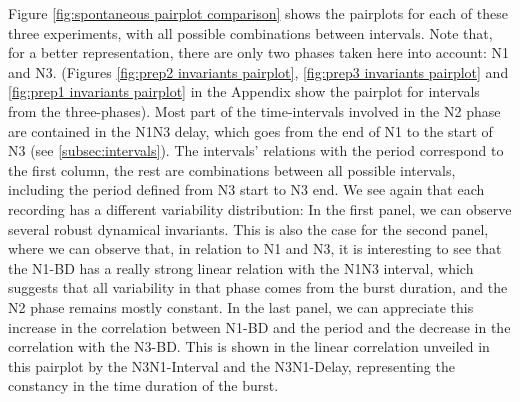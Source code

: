 Figure \ref{fig:spontaneous pairplot comparison} shows the pairplots for each of these three experiments, with all possible combinations between intervals. Note that, for a better representation, there are only two phases taken here into account: N1 and N3. (Figures \ref{fig:prep2 invariants pairplot}, \ref{fig:prep3 invariants pairplot} and \ref{fig:prep1 invariants pairplot} in the Appendix show the pairplot for intervals from the three-phases). Most part of the time-intervals involved in the N2 phase are contained in the N1N3 delay, which goes from the end of N1 to the start of N3 (see \ref{subsec:intervals}). The intervals' relations with the period correspond to the first column, the rest are combinations between all possible intervals, including the period defined from N3 start to N3 end. We see again that each recording has a different variability distribution: In the first panel, we can observe several robust dynamical invariants. This is also the case for the second panel, where we can observe that, in relation to N1 and N3, it is interesting to see that the N1-BD has a really strong linear relation with the N1N3 interval, which suggests that all variability in that phase comes from the burst duration, and the N2 phase remains mostly constant. In the last panel, we can appreciate this increase in the correlation between N1-BD and the period and the decrease in the correlation with the N3-BD. This is shown in the linear correlation unveiled in this pairplot by the N3N1-Interval and the N3N1-Delay, representing the constancy in the time duration of the burst.  

